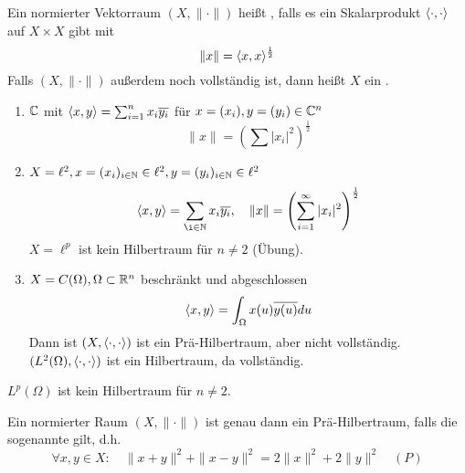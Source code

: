 \begin{definition}
	Ein normierter Vektorraum $(X, \| \cdot \|)$ hei{\ss}t , falls es ein Skalarprodukt $\langle \cdot, \cdot \rangle$ auf $X \times X$ gibt mit
		\[ \| x \| = \langle x, x \rangle^{\frac{1}{2}} \]
	Falls $(X, \| \cdot \|)$ au{\ss}erdem noch vollständig ist, dann hei{\ss}t $X$ ein .	
\end{definition}


\begin{beispiel}
	\begin{enumerate}[label=\alph*\upshape)]
		\item $\mathbb{C}$ mit $\langle x, y \rangle = \sum_{i = 1}^{n} x_{i} \overline{y_{i}}$ für $x = (x_{i}), y = (y_{i}) \in \mathbb{C}^{n}$ \\
			\[ \| x \| = \left( \sum | x_{i}|^{2} \right)^{\frac{1}{2}} \]
		\item $X = \ell^{2}, x = (x_{i})_{i \in \mathbb{N}} \in \ell^{2}, y = (y_{i})_{i \in \mathbb{N}} \in \ell^{2}$ \\
			\[ \< x, y \> = \sum_{\i \in \MdN} x_{i} \overline{y_{i}},  \quad \|x \| = \left( \sum_{i = 1}^{\infty} |x_{i}|^{2} \right)^{\frac{1}{2}} \]
			$X = \ell^{p}$ ist kein Hilbertraum für $n \neq 2$ (Übung).
		\item $X = C(\Omega), \Omega \subset \mathbb{R}^{n}$ beschränkt und abgeschlossen \\
			\[ \langle x, y \rangle = \int_{\Omega} x(u) \overline{y(u)} du \]
			Dann ist $(X, \langle \cdot, \cdot \rangle)$ ist ein Prä-Hilbertraum, aber nicht vollständig. \\
			$(L^{2}(\Omega), \langle \cdot, \cdot \rangle)$ ist ein Hilbertraum, da vollständig.
	\end{enumerate}	
\end{beispiel}


\begin{bemerkung*}
	$L^{p}(\Omega)$ ist kein Hilbertraum für $n \neq 2$.
\end{bemerkung*}


\begin{satz} \label{satz:15.6}
	Ein normierter Raum $(X, \| \cdot \|)$ ist genau dann ein Prä-Hilbertraum, falls die sogenannte  gilt, d.h.
	\[ \forall x, y \in X: \quad \|x + y \|^{2} + \| x - y \|^{2} = 2 \| x \|^{2} + 2 \| y \|^{2} \quad (P) \label{eq:15.6-rallelogrammGleichung} \]
\end{satz}

